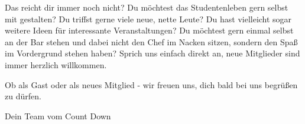 Das reicht dir immer noch nicht?
Du möchtest das Studentenleben gern selbst mit gestalten?
Du triffst gerne viele neue, nette Leute?
Du hast vielleicht sogar weitere Ideen für interessante Veranstaltungen?
Du möchtest gern einmal selbst an der Bar stehen und dabei nicht den Chef im Nacken sitzen, sondern den Spaß im Vordergrund stehen haben?
Sprich uns einfach direkt an, neue Mitglieder sind immer herzlich willkommen.

Ob als Gast oder als neues Mitglied - wir freuen uns, dich bald bei uns begrüßen zu dürfen.

Dein Team vom Count Down